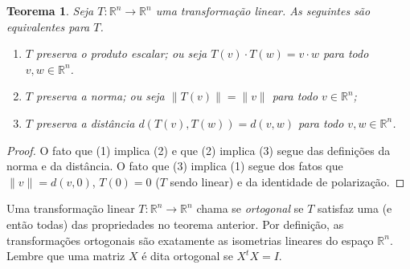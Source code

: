 \documentclass[12pt]{amsart}
\newcommand{\R}{\mathbb R}
\newtheorem{theorem}{Teorema}
\theoremstyle{definition}
\begin{document}
\begin{theorem}
Seja $T:\R^n\to \R^n$ uma transformação linear. As seguintes são equivalentes para $T$.
\begin{enumerate}
    \item $T$ preserva o produto escalar; ou seja $T(v)\cdot T(w)=v\cdot w$ para todo $v,w\in\R^n$. 
    \item $T$ preserva a norma; ou seja $\|T(v)\|=\|v\|$ para todo $v\in\R^n$;
    \item $T$ preserva a distância $d(T(v),T(w))=d(v,w)$ para todo $v,w\in\R^n$.
\end{enumerate}
\end{theorem}
\begin{proof}
    O fato que (1) implica (2) e que (2) implica (3) segue das definições da norma e da distância. O fato que 
    (3) implica (1) segue dos fatos que $\|v\|=d(v,0)$, $T(0)=0$ ($T$ sendo linear)  e da identidade de polarização.
\end{proof}


Uma transformação linear $T:\R^n\to \R^n$ chama se \emph{ortogonal} se $T$ satisfaz uma (e então todas) das propriedades no teorema anterior. Por definição, as transformações ortogonais são exatamente as isometrias lineares do espaço $\R^n$.  Lembre que uma matriz $X$ é dita ortogonal se $X^tX=I$.
\end{document}
